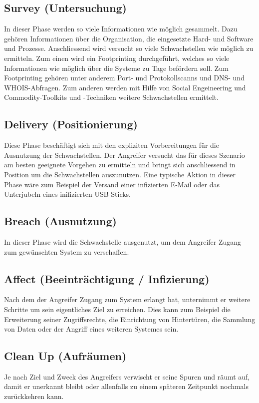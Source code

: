 \subsection{Survey (Untersuchung)}
In dieser Phase werden so viele Informationen wie möglich gesammelt. Dazu gehören Informationen über die Organisation, die eingesetzte Hard- und Software und Prozesse. Anschliessend wird versucht so viele Schwachstellen wie möglich zu ermitteln. Zum einen wird ein Footprinting durchgeführt, welches so viele Informationen wie möglich über die Systeme zu Tage befördern soll. Zum Footprinting gehören unter anderem Port- und Protokollscanns und DNS- und WHOIS-Abfragen. Zum anderen werden mit Hilfe von Social Engeineering und Commodity-Toolkits und -Techniken weitere Schwachstellen ermittelt.


\subsection{Delivery (Positionierung)}
Diese Phase beschäftigt sich mit den expliziten Vorbereitungen für die Ausnutzung der Schwachstellen. Der Angreifer versucht das für dieses Szenario am besten geeignete Vorgehen zu ermitteln und bringt sich anschliessend in Position um die Schwachstellen auszunutzen. Eine typische Aktion in dieser Phase wäre zum Beispiel der Versand einer infizierten E-Mail oder das Unterjubeln eines inifizierten USB-Sticks.


\subsection{Breach (Ausnutzung)}
In dieser Phase wird die Schwachstelle ausgenutzt, um dem Angreifer Zugang zum gewünschten System zu verschaffen.

\subsection{Affect (Beeinträchtigung / Infizierung)}
Nach dem der Angreifer Zugang zum System erlangt hat, unternimmt er weitere Schritte um sein eigentliches Ziel zu erreichen. Dies kann zum Beispiel die Erweiterung seiner Zugriffsrechte, die Einrichtung von Hintertüren, die Sammlung von Daten oder der Angriff eines weiteren Systemes sein.


\subsection{Clean Up (Aufräumen)}
Je nach Ziel und Zweck des Angreifers verwischt er seine Spuren und räumt auf, damit er unerkannt bleibt oder allenfalls zu einem späteren Zeitpunkt nochmals zurückkehren kann.
